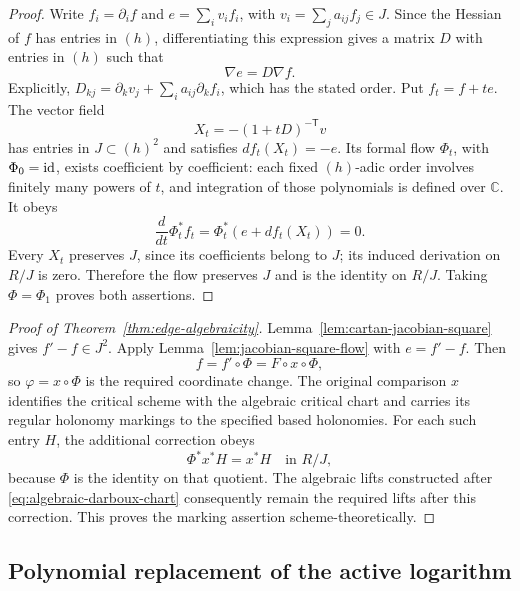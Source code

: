 \begin{proof}
Write \(f_i=\partial_i f\) and
\(e=\sum_i v_i f_i\), with \(v_i=\sum_j a_{ij}f_j\in J\).
Since the Hessian of \(f\) has entries in \((h)\), differentiating
this expression gives a matrix \(D\) with entries in \((h)\) such
that
\[
                   \nabla e=D\nabla f.
\]
Explicitly,
\(D_{kj}=\partial_kv_j+\sum_i a_{ij}\partial_k f_i\), which has
the stated order.  Put \(f_t=f+te\).  The vector field
\[
                  X_t=-(1+tD)^{-\mathsf T}v
\]
has entries in \(J\subset(h)^2\) and satisfies
\(df_t(X_t)=-e\).  Its formal flow \(\Phi_t\), with
\(\Phi_0=\operatorname{id}\), exists coefficient by coefficient: each fixed
\((h)\)-adic order involves finitely many powers of \(t\), and
integration of those polynomials is defined over \(\mathbb C\).
It obeys
\[
                 \frac{d}{dt}\Phi_t^*f_t
                    =\Phi_t^*(e+df_t(X_t))=0.
\]
Every \(X_t\) preserves \(J\), since its coefficients belong to
\(J\); its induced derivation on \(R/J\) is zero.  Therefore the
flow preserves \(J\) and is the identity on \(R/J\).
Taking \(\Phi=\Phi_1\) proves both assertions.
\end{proof}

\begin{proof}[Proof of Theorem~\ref{thm:edge-algebraicity}]
Lemma~\ref{lem:cartan-jacobian-square} gives \(f'-f\in J^2\).
Apply Lemma~\ref{lem:jacobian-square-flow} with \(e=f'-f\).
Then
\[
                    f= f'\circ\Phi=F\circ x\circ\Phi,
\]
so \(\varphi=x\circ\Phi\) is the required coordinate change.
The original comparison \(x\) identifies the critical scheme with
the algebraic critical chart and carries its regular holonomy
markings to the specified based holonomies.  For each such entry
\(H\), the additional correction obeys
\[
                      \Phi^*x^*H=x^*H\quad\text{in }R/J,
\]
because \(\Phi\) is the identity on that quotient.  The algebraic
lifts constructed after \eqref{eq:algebraic-darboux-chart} consequently
remain the required lifts after this correction.  This proves the
marking assertion scheme-theoretically.
\end{proof}

\subsection{Polynomial replacement of the active logarithm}

